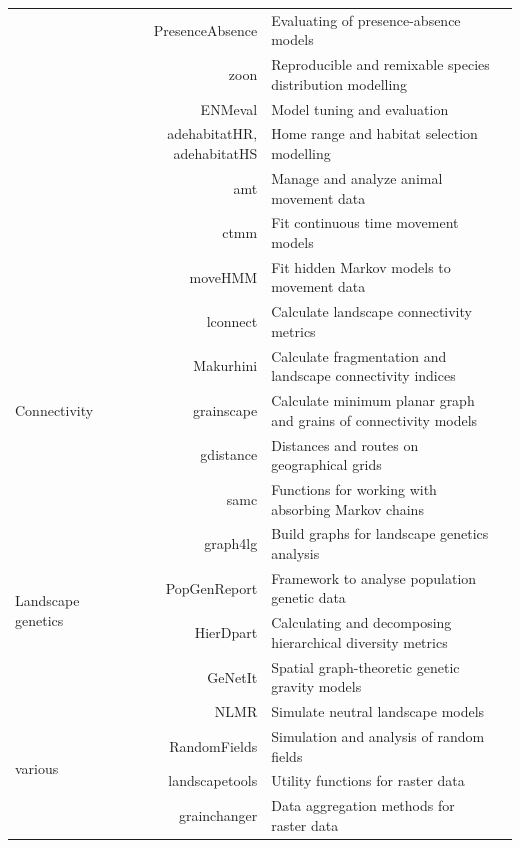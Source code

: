 \documentclass[smallextended]{svjour3}       %
\begin{document}
\begin{table}
\begin{tabularx}{1.35\linewidth}{lrXr}
& PresenceAbsence & Evaluating of presence-absence models & \cite{Freeman2008} \\
& zoon & Reproducible and remixable species distribution modelling & \cite{Golding2018} \\
& ENMeval & Model tuning and evaluation & \cite{Muscarella2014} \\
& adehabitatHR, adehabitatHS & Home range and habitat selection modelling & \cite{Calenge2006} \\
& amt & Manage and analyze animal movement data &\cite{Signer2019} \\
& ctmm & Fit continuous time movement models &\cite{Calabrese2016} \\
& moveHMM & Fit hidden Markov models to movement data &\cite{Michelot2016} \\
\hline
\multirow{5}{*}{Connectivity} & lconnect & Calculate landscape connectivity metrics & \cite{Mestre2019} \\
& Makurhini & Calculate fragmentation and landscape connectivity indices & \cite{Godinez-Gomez2020} \\
& grainscape & Calculate minimum planar graph and grains of connectivity models & \cite{Chubaty2020} \\
& gdistance & Distances and routes on geographical grids & \cite{vanEtten2017} \\
& samc & Functions for working with absorbing Markov chains & \cite{Marx2020} \\
\hline
\multirow{4}{*}{Landscape genetics} & graph4lg & Build graphs for landscape genetics analysis & \cite{Savary2020} \\
& PopGenReport & Framework to analyse population genetic data & \cite{Adamack2014,Gruber2015} \\
& HierDpart & Calculating and decomposing hierarchical diversity metrics & \cite{Qin2019} \\
& GeNetIt & Spatial graph-theoretic genetic gravity models & \cite{Murphy2010} \\
\hline
\multirow{4}{*}{various} & NLMR & Simulate neutral landscape models & \cite{Sciaini2018} \\
& RandomFields & Simulation and analysis of random fields & \cite{Schlather2015} \\
& landscapetools & Utility functions for raster data & \cite{Sciaini2018}  \\
& grainchanger & Data aggregation methods for raster data & \cite{Graham2019} \\
\hline

\end{tabularx}

\label{tab:packages}

\end{table}
\end{document}
